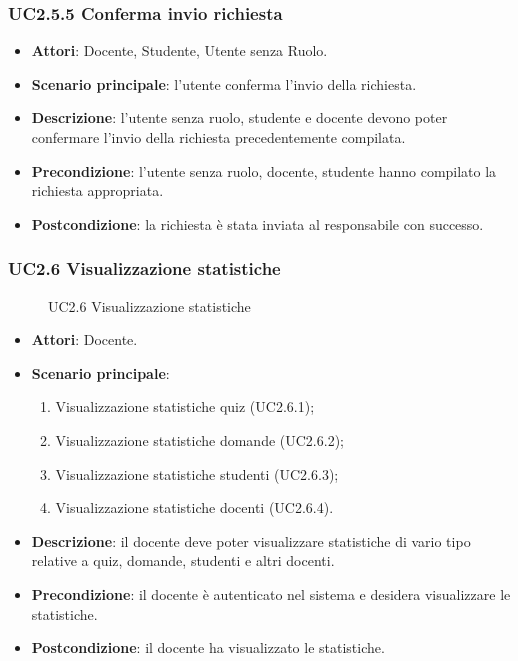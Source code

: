 \subsubsection{UC2.5.5 Conferma invio richiesta}
\begin{itemize}
\item \textbf{Attori}: Docente, Studente, Utente senza Ruolo.
\item \textbf{Scenario principale}: l'utente conferma l'invio della richiesta.
\item \textbf{Descrizione}: l'utente senza ruolo, studente e docente devono poter confermare l'invio della richiesta  precedentemente compilata.
\item \textbf{Precondizione}: l'utente senza ruolo, docente, studente hanno compilato la richiesta appropriata.
\item \textbf{Postcondizione}: la richiesta è stata inviata al responsabile con successo.
\end{itemize}
\subsubsection{UC2.6 Visualizzazione statistiche}
\begin{figure}[H]
\centering
\noindent{}
\caption{UC2.6 Visualizzazione statistiche}
\end{figure}
\begin{itemize}
\item \textbf{Attori}: Docente.
\item \textbf{Scenario principale}:
\begin{enumerate}
\item Visualizzazione statistiche quiz (UC2.6.1);
\item Visualizzazione statistiche domande (UC2.6.2);
\item Visualizzazione statistiche studenti (UC2.6.3);
\item Visualizzazione statistiche docenti (UC2.6.4).
\end{enumerate}
\item \textbf{Descrizione}: il docente deve poter visualizzare statistiche di vario tipo relative a quiz, domande, studenti e altri docenti.
\item \textbf{Precondizione}: il docente è autenticato nel sistema e desidera visualizzare le statistiche.
\item \textbf{Postcondizione}: il docente ha visualizzato le statistiche.
\end{itemize}
